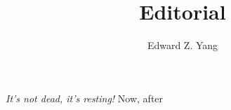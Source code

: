 \documentclass{tmr}
\title{Editorial}
\author{Edward Z. Yang\email{ezyang@mit.edu}}
\begin{document}
\textit{It's not dead, it's resting!}  Now, after
\end{document}

